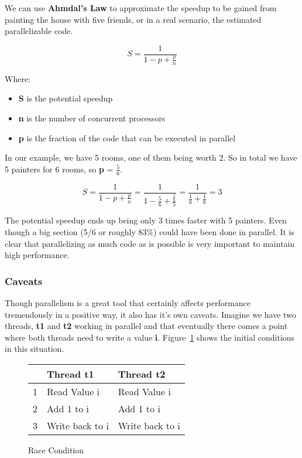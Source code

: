 \documentclass[letterpaper, 11pt]{article}
\begin{document}
We can use {\bfseries Ahmdal's Law} to approximate the speedup to be gained from painting the house with five friends, or in a real scenario, the estimated parallelizable code.

\begin{equation}
	S = \frac{1}{1-p+\frac{p}{n}}
\end{equation}

Where:

\begin{itemize}
	\item {\bfseries S} is the potential speedup
	\item {\bfseries n} is the number of concurrent processors
	\item {\bfseries p} is the fraction of the code that can be executed in parallel
\end{itemize}

In our example, we have 5 rooms, one of them being worth 2. So in total we have 5 painters for 6 rooms, so
{\bfseries p} = \(\frac{5}{6}\).


\begin{equation}
	S = \frac{1}{1-p+\frac{p}{n}} = \frac{1}{1-\frac{5}{6}+\frac{\frac{5}{6}}{5}} = \frac{1}{\frac{1}{6}+\frac{1}{6}} = 3
\end{equation}

The potential speedup ends up being only 3 times faster with 5 painters. Even though a big section
(5/6 or roughly 83\%) could have been done in parallel. It is clear that parallelizing as much
code as is possible is very important to maintain high performance.

\subsubsection{Caveats}

Though parallelism is a great tool that certainly affects performance tremendously in a positive way,
it also has it's own caveats. Imagine we have two threads, {\bfseries t1} and {\bfseries t2}
working in parallel and that eventually there comes a point where both threads need to write a value {\bfseries i}.
Figure~\ref{fig:race_cond_1} shows the initial conditions in this situation.
\par\vspace{\baselineskip}

\begin{figure}[H]
\centering
\begin{tabular}{|l|l|l|}
	\hline
	& {\bfseries Thread t1} & {\bfseries Thread t2} \\
	\hline
	1 & Read Value i & Read Value i \\
	\hline
	2 & Add 1 to i & Add 1 to i \\
	\hline
	3 & Write back to i & Write back to i \\
	\hline
\end{tabular}
\caption{Race Condition}
\label{fig:race_cond_1}
\end{figure}
\end{document}
